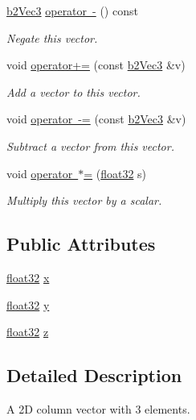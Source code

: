 \begin{DoxyCompactItemize}
\mbox{\hyperlink{structb2_vec3}{b2\+Vec3}} \mbox{\hyperlink{structb2_vec3_a92fcc8c903ffa85bb7175b9ad4709694}{operator -\/}} () const
\begin{DoxyCompactList}\small\item\em Negate this vector. \end{DoxyCompactList}\item 
void \mbox{\hyperlink{structb2_vec3_a2aaeed3f5308aad85d19c5f0efc72641}{operator+=}} (const \mbox{\hyperlink{structb2_vec3}{b2\+Vec3}} \&v)
\begin{DoxyCompactList}\small\item\em Add a vector to this vector. \end{DoxyCompactList}\item 
void \mbox{\hyperlink{structb2_vec3_afede796b5e732ccfb5abed4fb2e27077}{operator -\/=}} (const \mbox{\hyperlink{structb2_vec3}{b2\+Vec3}} \&v)
\begin{DoxyCompactList}\small\item\em Subtract a vector from this vector. \end{DoxyCompactList}\item 
void \mbox{\hyperlink{structb2_vec3_a504ee372ea33e84027b088cdbe4b2f72}{operator $\ast$=}} (\mbox{\hyperlink{b2_settings_8h_aacdc525d6f7bddb3ae95d5c311bd06a1}{float32}} s)
\begin{DoxyCompactList}\small\item\em Multiply this vector by a scalar. \end{DoxyCompactList}\end{DoxyCompactItemize}
\subsection*{Public Attributes}
\begin{DoxyCompactItemize}
\item 
\mbox{\hyperlink{b2_settings_8h_aacdc525d6f7bddb3ae95d5c311bd06a1}{float32}} \mbox{\hyperlink{structb2_vec3_aedc5e37849caa413a8e767fc47741db2}{x}}
\item 
\mbox{\hyperlink{b2_settings_8h_aacdc525d6f7bddb3ae95d5c311bd06a1}{float32}} \mbox{\hyperlink{structb2_vec3_af5a7e99d13d02ff9abb323838d44d3b1}{y}}
\item 
\mbox{\hyperlink{b2_settings_8h_aacdc525d6f7bddb3ae95d5c311bd06a1}{float32}} \mbox{\hyperlink{structb2_vec3_a7cb88968ff10fa500df0b10f5c425536}{z}}
\end{DoxyCompactItemize}


\subsection{Detailed Description}
A 2D column vector with 3 elements. 

